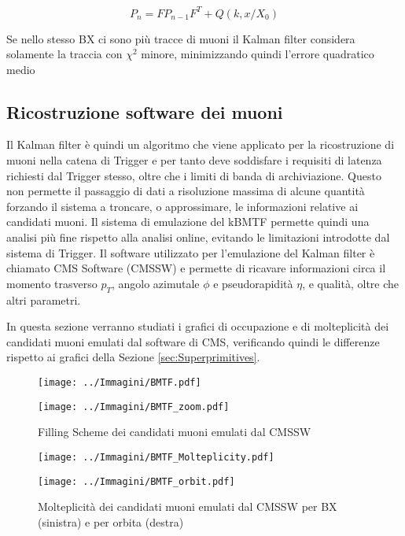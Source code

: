 \begin{equation}
  \label{eq:covariance}
  P_n = FP_{n-1}F^T + Q(k, x/X_0)
\end{equation}

Se nello stesso BX ci sono più tracce di muoni il Kalman filter considera solamente la traccia con $\chi^2$ minore, minimizzando quindi l'errore quadratico medio \cite{Summers:2728522}

\subsection{Ricostruzione software dei muoni}

Il Kalman filter è quindi un algoritmo che viene applicato per la ricostruzione di muoni nella catena di Trigger e per tanto deve soddisfare i requisiti di latenza richiesti dal Trigger stesso, oltre che i limiti di banda di archiviazione. Questo non permette il passaggio di dati a risoluzione massima di alcune quantità forzando il sistema a troncare, o approssimare, le informazioni relative ai candidati muoni. Il sistema di emulazione del kBMTF permette quindi una analisi più fine rispetto alla analisi online, evitando le limitazioni introdotte dal sistema di Trigger. Il software utilizzato per l'emulazione del Kalman filter è chiamato CMS Software (CMSSW) e permette di ricavare informazioni circa il momento trasverso $p_T$, angolo azimutale $\phi$ e pseudorapidità $\eta$, e qualità, oltre che altri parametri.

In questa sezione verranno studiati i grafici di occupazione e di molteplicità dei candidati muoni emulati dal software di CMS, verificando quindi le differenze rispetto ai grafici della Sezione \ref{sec:Superprimitives}.



\begin{figure}[t]
  \centering
  \begin{minipage}[b]{0.49\textwidth}
      \centering
      \texttt{[image: ../Immagini/BMTF.pdf]} 
    \end{minipage}
    \hfill 
    \begin{minipage}[b]{0.49\textwidth}
      \centering
      \texttt{[image: ../Immagini/BMTF\_zoom.pdf]} 
    \end{minipage}
    \caption{Filling Scheme dei candidati muoni emulati dal CMSSW}
  \label{fig:BMTFMuons}
\end{figure}

\begin{figure}[t]
  \centering
  \begin{minipage}[b]{0.49\textwidth}
      \centering
      \texttt{[image: ../Immagini/BMTF\_Molteplicity.pdf]} 
    \end{minipage}
    \hfill 
    \begin{minipage}[b]{0.49\textwidth}
      \centering
      \texttt{[image: ../Immagini/BMTF\_orbit.pdf]} 
    \end{minipage}
    \caption{Molteplicità dei candidati muoni emulati dal CMSSW per BX (sinistra) e per orbita (destra)}
  \label{fig:BMTFMolteplicity}
\end{figure}

